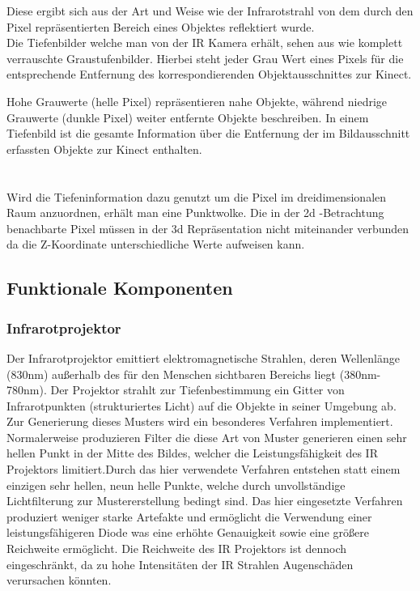  Diese ergibt sich aus der Art und Weise wie der Infrarotstrahl von dem durch den Pixel repräsentierten Bereich eines Objektes reflektiert wurde.
\\
Die Tiefenbilder welche man von der IR Kamera erhält, sehen aus wie komplett verrauschte Graustufenbilder. Hierbei steht jeder Grau Wert eines Pixels für die entsprechende Entfernung des korrespondierenden Objektausschnittes zur Kinect.




Hohe Grauwerte (helle Pixel) repräsentieren nahe Objekte, während niedrige Grauwerte (dunkle Pixel) weiter entfernte Objekte beschreiben. In einem Tiefenbild ist die gesamte Information über die Entfernung der im Bildausschnitt erfassten Objekte zur Kinect enthalten.\\ \\ \\

 Wird die Tiefeninformation dazu genutzt um die Pixel im dreidimensionalen Raum anzuordnen, erhält man eine Punktwolke. Die in der 2d 
-Betrachtung benachbarte Pixel müssen in der 3d Repräsentation nicht miteinander verbunden da die Z-Koordinate unterschiedliche Werte aufweisen kann.
\subsection{Funktionale Komponenten}
\subsubsection{Infrarotprojektor}

Der Infrarotprojektor emittiert elektromagnetische Strahlen, deren Wellenlänge (830nm) außerhalb des für den Menschen sichtbaren Bereichs liegt (380nm-780nm).
Der Projektor strahlt zur Tiefenbestimmung ein Gitter von Infrarotpunkten (strukturiertes Licht) auf die Objekte in seiner Umgebung ab. 
Zur Generierung dieses Musters wird ein besonderes Verfahren implementiert.
Normalerweise produzieren Filter die diese Art von Muster generieren einen sehr hellen Punkt in der Mitte des Bildes, welcher die Leistungsfähigkeit des IR Projektors limitiert.Durch das hier verwendete Verfahren entstehen statt einem einzigen sehr hellen, neun helle Punkte, welche durch unvollständige Lichtfilterung zur Mustererstellung bedingt sind. Das hier eingesetzte Verfahren produziert weniger starke Artefakte und ermöglicht die Verwendung einer leistungsfähigeren Diode was eine erhöhte Genauigkeit sowie eine größere Reichweite ermöglicht. Die Reichweite des IR Projektors ist dennoch eingeschränkt, da zu hohe Intensitäten der IR Strahlen Augenschäden verursachen könnten.


